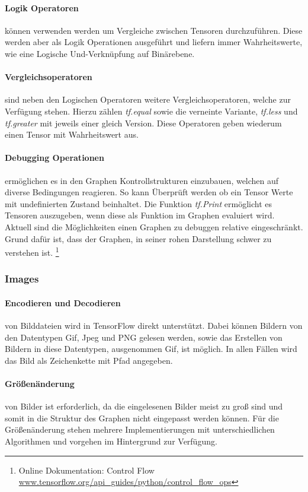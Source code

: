 \paragraph{Logik Operatoren} können verwenden werden um Vergleiche zwischen Tensoren durchzuführen. 
Diese werden aber als Logik Operationen ausgeführt und liefern immer Wahrheitswerte, wie eine Logische Und-Verknüpfung auf Binärebene.

\paragraph{Vergleichsoperatoren} sind neben den Logischen Operatoren weitere Vergleichsoperatoren, welche zur Verfügung stehen. 
Hierzu zählen \textit{tf.equal} sowie die verneinte Variante, \textit{tf.less} und \textit{tf.greater} mit jeweils einer gleich Version. 
Diese Operatoren geben wiederum einen Tensor mit Wahrheitswert aus.

\paragraph{Debugging Operationen} ermöglichen es in den Graphen Kontrollstrukturen einzubauen, welchen auf diverse Bedingungen reagieren.
So kann Überprüft werden ob ein Tensor Werte mit undefinierten Zustand beinhaltet. 
Die Funktion \textit{tf.Print} ermöglicht es Tensoren auszugeben, wenn diese als Funktion im Graphen evaluiert wird. 
Aktuell sind die Möglichkeiten einen Graphen zu debuggen relative eingeschränkt. 
Grund dafür ist, dass der Graphen, in seiner rohen Darstellung schwer zu verstehen ist. \footnote{Online Dokumentation: Control Flow \url{www.tensorflow.org/api_guides/python/control_flow_ops}}

\subsubsection{Images}

\paragraph{Encodieren und Decodieren} von Bilddateien wird in TensorFlow direkt unterstützt.
Dabei können Bildern von den Datentypen Gif, Jpeg und PNG gelesen werden, sowie das Erstellen von Bildern in diese Datentypen, ausgenommen Gif, ist möglich.
In allen Fällen wird das Bild als Zeichenkette mit Pfad angegeben. 

\paragraph{Größenänderung} von Bilder ist erforderlich, da die eingelesenen Bilder meist zu groß sind und somit in die Struktur des Graphen nicht eingepasst werden können. 
Für die Größenänderung stehen mehrere Implementierungen mit unterschiedlichen Algorithmen und vorgehen im Hintergrund zur Verfügung.

